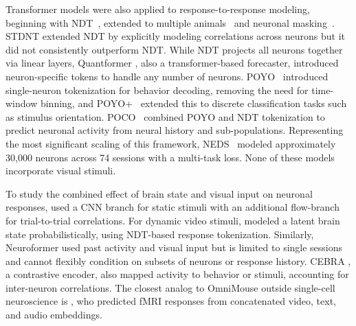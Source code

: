 \documentclass{article} %
\begin{document}
Transformer models were also applied to response-to-response modeling, beginning with NDT~\citep{ndt1}, extended to multiple animals~\citep{ndtv2} and neuronal masking~\citep{universalspiketranslator}.
STDNT \citep{le2022stndt} extended NDT by explicitly modeling correlations across neurons but it did not consistently outperform NDT.
While NDT projects all neurons together via linear layers, Quantformer \citep{quantformer}, also a
transformer-based forecaster, introduced neuron-specific tokens to handle any number of neurons.
POYO~\citep{azabou2023unified} introduced single-neuron tokenization for behavior decoding, removing the need for time-window binning, and POYO+~\citep{poyov2iclr2025} extended this to discrete classification tasks such as stimulus orientation.
POCO~\citep{duan2025poco} combined POYO and NDT tokenization to predict neuronal activity from neural history and sub-populations. 
Representing the most significant scaling of this framework, NEDS~\citep{zhang2025neuralencodingdecodingscale} modeled approximately 30,000 neurons across 74 sessions with a multi-task loss.
None of these models incorporate visual stimuli.

To study the combined effect of brain state and visual input on neuronal responses, \citet{bashiri2021flow} used a CNN branch for static stimuli with an additional flow-branch for trial-to-trial correlations.
For dynamic video stimuli, \citet{schmidt2025modelingdynamicneuralactivity} modeled a latent brain state probabilistically, using NDT-based response tokenization.
Similarly, Neuroformer \citep{neuroformer} used past activity and visual input but is limited to single sessions and cannot flexibly condition on subsets of neurons or response history.
CEBRA \citep{schneider2023learnable}, a contrastive encoder, also mapped activity to behavior or stimuli, accounting for inter-neuron correlations.
The closest analog to OmniMouse outside single-cell neuroscience is \citet{d2025tribe}, who predicted fMRI responses from concatenated video, text, and audio embeddings.
\end{document}
